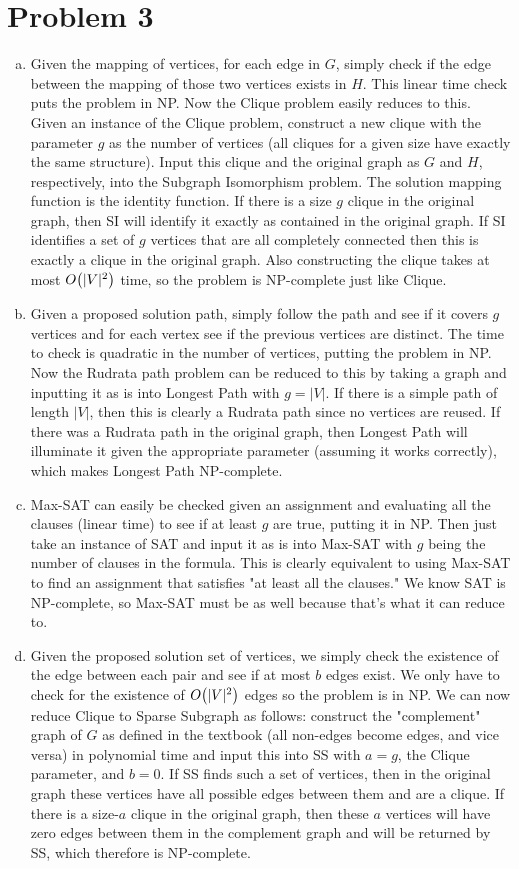 \documentclass[11pt]{article}
\let\origleft\left
\let\origright\right
\renewcommand{\left}{\mathopen{}\mathclose\bgroup\origleft}
\renewcommand{\right}{\aftergroup\egroup\origright}
\newcommand{\p}[1]{\left(#1\right)}
\newcommand{\BigOh}[1]{O\p{#1}}
\begin{document}
\section*{Problem 3}
\begin{enumerate}[(a)]
\item Given the mapping of vertices, for each edge in $G$, simply check if the edge between the mapping of those two vertices exists in $H$. This linear time check puts the problem in NP. Now the Clique problem easily reduces to this. Given an instance of the Clique problem, construct a new clique with the parameter $g$ as the number of vertices (all cliques for a given size have exactly the same structure). Input this clique and the original graph as $G$ and $H$, respectively, into the Subgraph Isomorphism problem. The solution mapping function is the identity function. If there is a size $g$ clique in the original graph, then SI will identify it exactly as contained in the original graph. If SI identifies a set of $g$ vertices that are all completely connected then this is exactly a clique in the original graph. Also constructing the clique takes at most $\BigOh{|V|^2}$ time, so the problem is NP-complete just like Clique.
\item Given a proposed solution path, simply follow the path and see if it covers $g$ vertices and for each vertex see if the previous vertices are distinct. The time to check is quadratic in the number of vertices, putting the problem in NP. Now the Rudrata path problem can be reduced to this by taking a graph and inputting it as is into Longest Path with $g=|V|$. If there is a simple path of length $|V|$, then this is clearly a Rudrata path since no vertices are reused. If there was a Rudrata path in the original graph, then Longest Path will illuminate it given the appropriate parameter (assuming it works correctly), which makes Longest Path NP-complete.
\item Max-SAT can easily be checked given an assignment and evaluating all the clauses (linear time) to see if at least $g$ are true, putting it in NP. Then just take an instance of SAT and input it as is into Max-SAT with $g$ being the number of clauses in the formula. This is clearly equivalent to using Max-SAT to find an assignment that satisfies "at least all the clauses." We know SAT is NP-complete, so Max-SAT must be as well because that's what it can reduce to.
\item Given the proposed solution set of vertices, we simply check the existence of the edge between each pair and see if at most $b$ edges exist. We only have to check for the existence of $\BigOh{|V|^2}$ edges so the problem is in NP. We can now reduce Clique to Sparse Subgraph as follows: construct the "complement" graph of $G$ as defined in the textbook (all non-edges become edges, and vice versa) in polynomial time and input this into SS with $a=g$, the Clique parameter, and $b=0$. If SS finds such a set of vertices, then in the original graph these vertices have all possible edges between them and are a clique. If there is a size-$a$ clique in the original graph, then these $a$ vertices will have zero edges between them in the complement graph and will be returned by SS, which therefore is NP-complete.

\end{enumerate}
\end{document}
